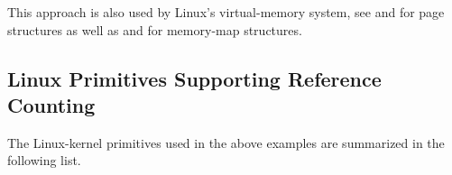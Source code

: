 This approach is also used by Linux's virtual-memory system,
see  and  for
page structures as well as  and 
for memory-map structures.

\subsection{Linux Primitives Supporting Reference Counting}
\label{sec:defer:Linux Primitives Supporting Reference Counting}

The Linux-kernel primitives used in the above examples are
summarized in the following list.

